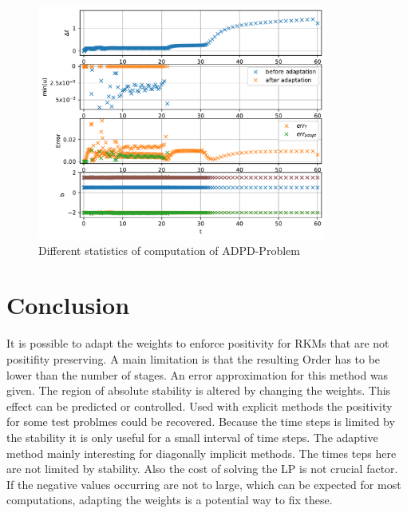 \documentclass[a4paper]{scrartcl}
\numberwithin{equation}{section}
\theoremstyle{plain}
\theoremstyle{definition}
\numberwithin{theorem}{section}
\newcommand{\1}{\mathbbm{1}}
\begin{document}
\begin{figure}
\centering
\includegraphics[width=0.85\textwidth]{plots/ADP_stepsize,b.pdf}
\caption{Different statistics of computation of ADPD-Problem}
\label{fig:Stats_ADP}
\end{figure}


\section{Conclusion} \label{sec:conclusion}
It is possible to adapt the weights to enforce positivity for RKMs that are not positifity preserving.
A main limitation is that the resulting Order has to be lower than the number of stages. 
An error approximation for this method was given. 
The region of absolute stability is altered by changing the weights. This effect can be predicted or controlled.
Used with explicit methods the positivity for some test problmes could be recovered. 
Because the time steps is limited by the stability it is only useful for a small interval of time steps.
The adaptive method mainly interesting for diagonally implicit methods. 
The times teps here are not limited by stability.
Also the cost of solving the LP is not crucial factor. 
If the negative values occurring are not to large, which can be expected for most computations, adapting the weights is a potential way to fix these.




\printbibliography
\end{document}
